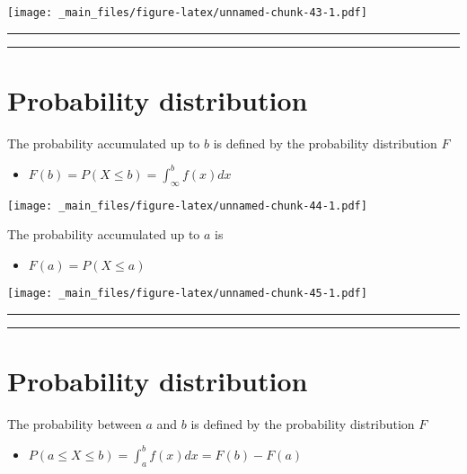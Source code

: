\documentclass[
]{book}
\providecommand{\tightlist}{%
  \setlength{\itemsep}{0pt}\setlength{\parskip}{0pt}}
\begin{document}
\texttt{[image: \_main\_files/figure-latex/unnamed-chunk-43-1.pdf]}

\begin{center}\rule{0.5\linewidth}{0.5pt}\end{center}

\begin{center}\rule{0.5\linewidth}{0.5pt}\end{center}

\hypertarget{probability-distribution-2}{%
\section{Probability distribution}\label{probability-distribution-2}}

The probability accumulated up to \(b\) is defined by the probability distribution \(F\)

\begin{itemize}
\tightlist
\item
  \(F(b) = P(X \leq b)=\int_\infty^bf(x)dx\)
\end{itemize}

\texttt{[image: \_main\_files/figure-latex/unnamed-chunk-44-1.pdf]}

The probability accumulated up to \(a\) is

\begin{itemize}
\tightlist
\item
  \(F(a) = P(X \leq a)\)
\end{itemize}

\texttt{[image: \_main\_files/figure-latex/unnamed-chunk-45-1.pdf]}

\begin{center}\rule{0.5\linewidth}{0.5pt}\end{center}

\begin{center}\rule{0.5\linewidth}{0.5pt}\end{center}

\hypertarget{probability-distribution-3}{%
\section{Probability distribution}\label{probability-distribution-3}}

The probability between \(a\) and \(b\) is defined by the probability distribution \(F\)

\begin{itemize}
\tightlist
\item
  \(P(a\leq X \leq b) = \int_a^b f(x)dx=F(b)-F(a)\)
\end{itemize}
\end{document}
